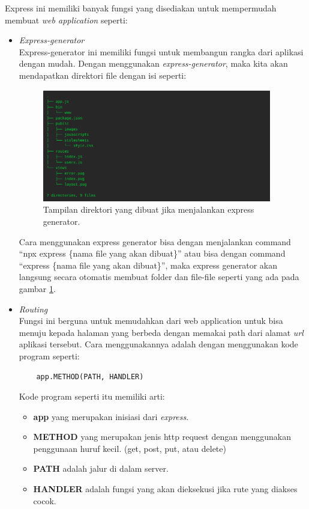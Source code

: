 Express ini memiliki banyak fungsi yang disediakan untuk mempermudah membuat \textit{web application} seperti: 
\begin{itemize}
    \item {\textit{Express-generator}}\\
    Express-generator ini memiliki fungsi untuk membangun rangka dari aplikasi dengan mudah. Dengan menggunakan \textit{express-generator}, maka kita akan mendapatkan direktori file dengan isi seperti: \\
    \begin{figure}[h]
      \includegraphics[width=10cm]{./Gambar/express_generator.png}
      \centering
      \caption{Tampilan direktori yang dibuat jika menjalankan express generator.}
      \label{fig:express_generator}
    \end{figure}
    
    Cara menggunakan express generator bisa dengan menjalankan command ``npx express \{nama file yang akan dibuat\}'' atau bisa dengan command ``express \{nama file yang akan dibuat\}'', maka express generator akan langsung secara otomatis membuat folder dan file-file seperti yang ada pada gambar \ref{fig:express_generator}. 
    
    \item {\textit{Routing}}\\
    Fungsi ini berguna untuk memudahkan dari web application untuk bisa menuju kepada halaman yang berbeda dengan memakai path dari alamat \textit{url} aplikasi tersebut. Cara menggunakannya adalah dengan menggunakan kode program seperti:
    \begin{lstlisting}
    app.METHOD(PATH, HANDLER)
    \end{lstlisting}
    Kode program seperti itu memiliki arti:
    \begin{itemize}
        \item \textbf{app} yang merupakan inisiasi dari \textit{express}.
        \item \textbf{METHOD} yang merupakan jenis http request dengan menggunakan penggunaan huruf kecil. (get, post, put, atau delete)
        \item \textbf{PATH} adalah jalur di dalam server.
        \item \textbf{HANDLER} adalah fungsi yang akan dieksekusi jika rute yang diakses cocok. 
    \end{itemize}
\end{itemize}

